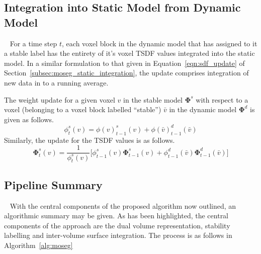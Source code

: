 \subsection{Integration into Static Model from Dynamic Model}
~\label{sub:moseg_static_to_dynamic}
For a time step \(t\), each voxel block in the dynamic model that has assigned to
it a stable label has the entirety of it's voxel TSDF values integrated into the
static model. In a similar formulation to that given in Equation~\ref{eqn:sdf_update}
of Section~\ref{subsec:moseg_static_integration}, the update comprises 
integration of new data in to a running average.

The weight update for a given voxel \(v\) in the stable model \(\bm{\Phi}^{s}\)
with respect to a voxel (belonging to a voxel block labelled ``stable'') 
\(\bar{v}\) in the dynamic model \(\bm{\Phi}^{d}\) is given as follows.
\begin{equation}
  \label{eqn:moseg_weight_update}
  \phi^{s}_{t}(v) = \phi{(v)}^{s}_{t-1}(v) + \phi{(\bar{v})}^{d}_{t-1}(\bar{v})
\end{equation}
Similarly, the update for the TSDF values is as follows.
\begin{equation}
  \label{eqn:moseg_sdf_update}
  \bm{\Phi}^{s}_{t}(v) = \frac{1}{\phi^{s}_{t}(v)} \bigg[
  \phi^{s}_{t-1}(v) \bm{\Phi}^{s}_{t-1}(v) +
  \phi^{d}_{t-1}(\bar{v}) \bm{\Phi}^{d}_{t-1}(\bar{v})
  \bigg]
\end{equation}

\subsection{Pipeline Summary}
~\label{subsec:moseg_pipeline_summary}
With the central components of the proposed algorithm now outlined, an algorithmic 
summary may be given. As has been highlighted, the central components of the approach 
are the dual volume representation, stability labelling and inter-volume surface 
integration. The process is as follows in Algorithm~\ref{alg:moseg}

